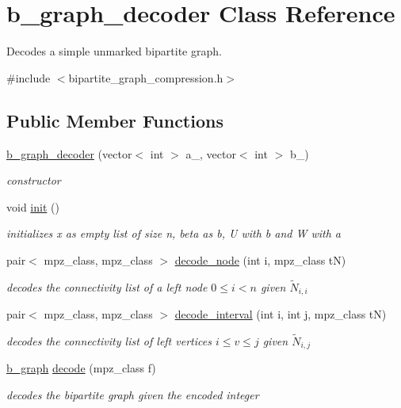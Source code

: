 \hypertarget{classb__graph__decoder}{}\section{b\+\_\+graph\+\_\+decoder Class Reference}
\label{classb__graph__decoder}


Decodes a simple unmarked bipartite graph.  




{\ttfamily \#include $<$bipartite\+\_\+graph\+\_\+compression.\+h$>$}

\subsection*{Public Member Functions}
\begin{DoxyCompactItemize}
\item 
\hyperlink{classb__graph__decoder_a2284e65bb4fcdd9356fc6a3109c2a4a7}{b\+\_\+graph\+\_\+decoder} (vector$<$ int $>$ a\+\_\+, vector$<$ int $>$ b\+\_\+)
\begin{DoxyCompactList}\small\item\em constructor \end{DoxyCompactList}\item 
void \hyperlink{classb__graph__decoder_a9498e8aa7391480cc663bffef3718c6b}{init} ()
\begin{DoxyCompactList}\small\item\em initializes x as empty list of size n, beta as b, U with b and W with a \end{DoxyCompactList}\item 
pair$<$ mpz\+\_\+class, mpz\+\_\+class $>$ \hyperlink{classb__graph__decoder_a3d6d38da4436a92ebd01693cd3eb7c16}{decode\+\_\+node} (int i, mpz\+\_\+class tN)
\begin{DoxyCompactList}\small\item\em decodes the connectivity list of a left node $0 \leq i < n$ given $\tilde{N}_{i,i}$ \end{DoxyCompactList}\item 
pair$<$ mpz\+\_\+class, mpz\+\_\+class $>$ \hyperlink{classb__graph__decoder_ae8b20698e015819cbdb8da7997888fd8}{decode\+\_\+interval} (int i, int j, mpz\+\_\+class tN)
\begin{DoxyCompactList}\small\item\em decodes the connectivity list of left vertices $i \leq v \leq j$ given $\tilde{N}_{i,j}$ \end{DoxyCompactList}\item 
\hyperlink{classb__graph}{b\+\_\+graph} \hyperlink{classb__graph__decoder_a81cffad95fa5a051fa4421b164f236a9}{decode} (mpz\+\_\+class f)
\begin{DoxyCompactList}\small\item\em decodes the bipartite graph given the encoded integer \end{DoxyCompactList}\end{DoxyCompactItemize}

